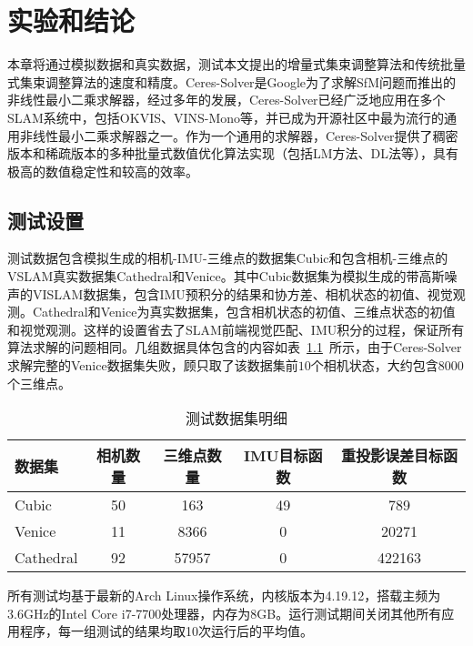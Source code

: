 \chapter{实验和结论}\label{ch:exp}

本章将通过模拟数据和真实数据，测试本文提出的增量式集束调整算法和传统批量式集束调整算法的速度和精度。Ceres-Solver是Google为了求解SfM问题而推出的非线性最小二乘求解器，经过多年的发展，Ceres-Solver已经广泛地应用在多个SLAM系统中，包括OKVIS、VINS-Mono等，并已成为开源社区中最为流行的通用非线性最小二乘求解器之一。作为一个通用的求解器，Ceres-Solver提供了稠密版本和稀疏版本的多种批量式数值优化算法实现（包括LM方法、DL法等），具有极高的数值稳定性和较高的效率。

\section{测试设置}

测试数据包含模拟生成的相机-IMU-三维点的数据集Cubic和包含相机-三维点的VSLAM真实数据集Cathedral\citep{kim2014influence}和Venice\citep{kummerle2011g}。其中Cubic数据集为模拟生成的带高斯噪声的VISLAM数据集，包含IMU预积分的结果和协方差、相机状态的初值、视觉观测。Cathedral和Venice为真实数据集，包含相机状态的初值、三维点状态的初值和视觉观测。这样的设置省去了SLAM前端视觉匹配、IMU积分的过程，保证所有算法求解的问题相同。几组数据具体包含的内容如表~\ref{tab:dataset}~所示，由于Ceres-Solver求解完整的Venice数据集失败，顾只取了该数据集前$10$个相机状态，大约包含$8000$个三维点。

{
\linespread{1}
\begin{table}[htb!]
\caption{测试数据集明细}
\label{tab:dataset}
\centering
\begin{tabular}{l|cccc}
    \toprule
    数据集    & 相机数量 & 三维点数量 & IMU目标函数 & 重投影误差目标函数 \\ \midrule
    Cubic     &       50 &        163 &          49 &                789 \\
    Venice    &       11 &       8366 &           0 &              20271 \\
    Cathedral &       92 &      57957 &           0 &             422163 \\
    \bottomrule
\end{tabular}
\end{table}
}

所有测试均基于最新的Arch Linux操作系统，内核版本为4.19.12，搭载主频为3.6GHz的Intel Core i7-7700处理器，内存为8GB。运行测试期间关闭其他所有应用程序，每一组测试的结果均取10次运行后的平均值。

